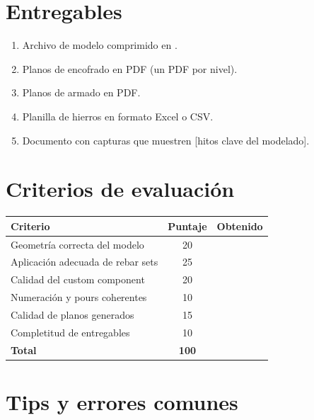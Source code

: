 \documentclass[11pt,a4paper]{article}
\begin{document}
\section{Entregables}
\begin{entregable}
\begin{enumerate}
    \item Archivo de modelo  comprimido en .
    \item Planos de encofrado en PDF (un PDF por nivel).
    \item Planos de armado en PDF.
    \item Planilla de hierros en formato Excel o CSV.
    \item Documento con capturas que muestren [hitos clave del modelado].
\end{enumerate}
\end{entregable}

\section{Criterios de evaluación}
\begin{table}[H]
\centering
\begin{tabularx}{\textwidth}{Xcc}
\toprule
\textbf{Criterio} & \textbf{Puntaje} & \textbf{Obtenido} \\
\midrule
Geometría correcta del modelo & 20 & \\
Aplicación adecuada de rebar sets & 25 & \\
Calidad del custom component & 20 & \\
Numeración y pours coherentes & 10 & \\
Calidad de planos generados & 15 & \\
Completitud de entregables & 10 & \\
\midrule
\textbf{Total} & \textbf{100} & \\
\bottomrule
\end{tabularx}
\end{table}

\section{Tips y errores comunes}
\begin{tip}
[Tip 1]
\end{tip}
\end{document}
